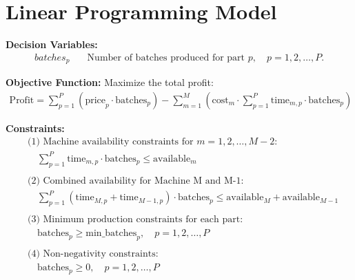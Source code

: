\documentclass{article}
\begin{document}
\section*{Linear Programming Model}

\textbf{Decision Variables:}
\begin{align*}
batches_p & \quad \text{Number of batches produced for part } p, \quad p = 1, 2, \ldots, P.
\end{align*}

\textbf{Objective Function:}
Maximize the total profit:
\begin{align*}
\text{Profit} = \sum_{p=1}^{P} \left( \text{price}_p \cdot \text{batches}_p \right) - \sum_{m=1}^{M} \left( \text{cost}_m \cdot \sum_{p=1}^{P} \text{time}_{m,p} \cdot \text{batches}_p \right)
\end{align*}

\textbf{Constraints:}
\begin{align*}
& \text{(1) Machine availability constraints for } m = 1, 2, \ldots, M-2: \\
& \quad \sum_{p=1}^{P} \text{time}_{m,p} \cdot \text{batches}_p \leq \text{available}_m \\
\\
& \text{(2) Combined availability for Machine M and M-1:} \\
& \quad \sum_{p=1}^{P} \left( \text{time}_{M,p} + \text{time}_{M-1,p} \right) \cdot \text{batches}_p \leq \text{available}_M + \text{available}_{M-1} \\
\\
& \text{(3) Minimum production constraints for each part:} \\
& \quad \text{batches}_p \geq \text{min\_batches}_p, \quad p = 1, 2, \ldots, P \\
\\
& \text{(4) Non-negativity constraints:} \\
& \quad \text{batches}_p \geq 0, \quad p = 1, 2, \ldots, P
\end{align*}
\end{document}

